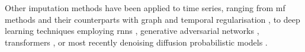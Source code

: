 Other imputation methods have been applied to time series, ranging from \gls{mf} methods \cite{salakhutdinov2008bayesian, lee2000algorithms} and their counterparts with graph and temporal regularisation \cite{cai2010graph, yu2016temporal}, to deep learning techniques employing \glspl{rnn} \cite{cao2018brits}, generative adversarial networks \cite{yoon2019time, liu2019naomi}, transformers \cite{du2023saits}, or most recently denoising diffusion probabilistic models \cite{tashiro2021csdi, alcaraz2021diffusion, jenkins2023improving}.